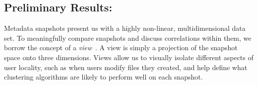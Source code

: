 \subsection{Preliminary Results: }
Metadata snapshots present us with a highly non-linear, multidimensional
data set.  To meaningfully compare snapshots and discuss correlations within
them, we borrow the concept of a \textit{view}~\cite{mascotssnapshot}.  A view is simply a
projection of the snapshot space onto three dimensions.  Views allow us to
visually isolate different aspects of user locality, such as when users modify
files they created, and help define what clustering
algorithms are likely to perform well on each snapshot.

